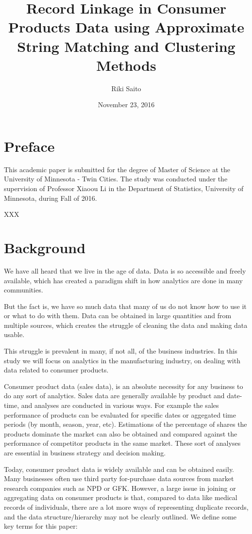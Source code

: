 \documentclass[]{article}
\title{Record Linkage in Consumer Products Data using Approximate String
Matching and Clustering Methods}
\author{Riki Saito}
\date{November 23, 2016}
\begin{document}
\maketitle

\newpage

\tableofcontents
\newpage

\section{Preface}\label{preface}

This academic paper is submitted for the degree of Master of Science at
the University of Minnesota - Twin Cities. The study was conducted under
the supervision of Professor Xiaoou Li in the Department of Statistics,
University of Minnesota, during Fall of 2016.

XXX

\section{Background}\label{background}

We have all heard that we live in the age of data. Data is so accessible
and freely available, which has created a paradigm shift in how
analytics are done in many communities.

But the fact is, we have so much data that many of us do not know how to
use it or what to do with them. Data can be obtained in large quantities
and from multiple sources, which creates the struggle of cleaning the
data and making data usable.

This struggle is prevalent in many, if not all, of the business
industries. In this study we will focus on analytics in the
manufacturing industry, on dealing with data related to consumer
products.

Consumer product data (sales data), is an absolute necessity for any
business to do any sort of analytics. Sales data are generally available
by product and date-time, and analyses are conducted in various ways.
For example the sales performance of products can be evaluated for
specific dates or aggegated time periods (by month, season, year, etc).
Estimations of the percentage of shares the products dominate the market
can also be obtained and compared against the performance of competitor
products in the same market. These sort of analyses are essential in
business strategy and decision making.

Today, consumer product data is widely available and can be obtained
easily. Many businesses often use third party for-purchase data sources
from market research companies such as NPD or GFK. However, a large
issue in joining or aggregating data on consumer products is that,
compared to data like medical records of individuals, there are a lot
more ways of representing duplicate records, and the data
structure/hierarchy may not be clearly outlined. We define some key
terms for this paper:
\end{document}

